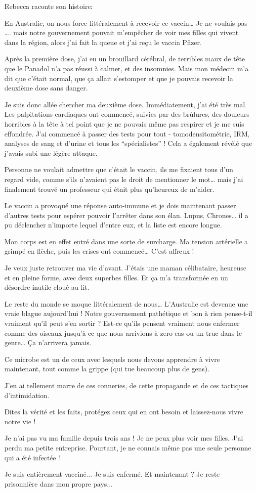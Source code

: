 Rebecca raconte son histoire:

En Australie, on nous force littéralement à recevoir ce vaccin… Je ne voulais
pas …. mais notre gouvernement pouvait m'empêcher de voir mes filles qui vivent
dans la région, alors j'ai fait la queue et j'ai reçu le vaccin Pfizer.

Après la première dose, j'ai eu un brouillard cérébral, de terribles maux de
tête que le Panadol n'a pas réussi à calmer, et des insomnies. Mais mon médecin
m'a dit que c'était normal, que ça allait s'estomper et que je pouvais recevoir
la deuxième dose sans danger.

Je suis donc allée chercher ma deuxième dose. Immédiatement, j'ai été très
mal. Les palpitations cardiaques ont commencé, suivies par des brûlures, des
douleurs horribles à la tête à tel point que je ne pouvais même pas respirer et
je me suis effondrée. J'ai commencé à passer des tests pour tout -
tomodensitométrie, IRM, analyses de sang et d'urine et tous les “spécialistes” !
Cela a également révélé que j'avais subi une légère attaque.

Personne ne voulait admettre que c'était le vaccin, ils me fixaient tous d'un
regard vide, comme s'ils n'avaient pas le droit de mentionner le mot… mais j'ai
finalement trouvé un professeur qui était plus qu'heureux de m'aider.

Le vaccin a provoqué une réponse auto-immune et je dois maintenant passer
d'autres tests pour espérer pouvoir l'arrêter dans son élan. Lupus, Chrones… il
a pu déclencher n'importe lequel d'entre eux, et la liste est encore longue.

Mon corps est en effet entré dans une sorte de surcharge. Ma tension artérielle
a grimpé en flèche, puis les crises ont commencé… C'est affreux !

Je veux juste retrouver ma vie d'avant. J'étais une maman célibataire, heureuse
et en pleine forme, avec deux superbes filles. Et ça m'a transformée en un
désordre inutile cloué au lit.

Le reste du monde se moque littéralement de nous… L'Australie est devenue une
vraie blague aujourd'hui ! Notre gouvernement pathétique et bon à rien
pense-t-il vraiment qu'il peut s'en sortir ? Est-ce qu'ils pensent vraiment nous
enfermer comme des oiseaux jusqu'à ce que nous arrivions à zero cas ou un truc
dans le genre… Ça n'arrivera jamais.

Ce microbe est un de ceux avec lesquels nous devons apprendre à vivre maintenant, tout comme la grippe (qui tue beaucoup plus de gens).

J'en ai tellement marre de ces conneries, de cette propagande et de ces tactiques d'intimidation.

Dites la vérité et les faits, protégez ceux qui en ont besoin et laissez-nous vivre notre vie !

Je n'ai pas vu ma famille depuis trois ans ! Je ne peux plus voir mes
filles. J'ai perdu ma petite entreprise. Pourtant, je ne connais même pas une
seule personne qui a été infectée !

Je suis entièrement vacciné... Je suis enfermé. Et maintenant ? Je reste
prisonnière dans mon propre pays...

